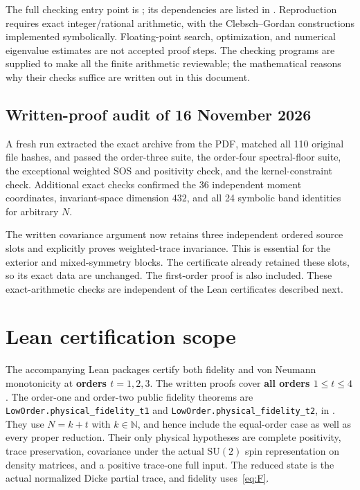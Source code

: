\documentclass[11pt,a4paper]{article}
\begin{document}
The full checking entry point is ; its dependencies
are listed in . Reproduction requires exact
integer/rational arithmetic, with the Clebsch--Gordan constructions
implemented symbolically. Floating-point search, optimization, and
numerical eigenvalue estimates are not accepted proof steps. The
checking programs are supplied to make all the finite arithmetic
reviewable; the mathematical reasons why their checks suffice are
written out in this document.

\subsection{Written-proof audit of 16 November 2026}
A fresh run extracted the exact archive from the PDF, matched all 110
original file hashes, and passed the order-three suite, the order-four
spectral-floor suite, the exceptional weighted SOS and positivity check,
and the kernel-constraint check. Additional exact checks confirmed the
36 independent moment coordinates, invariant-space dimension $432$, and
all 24 symbolic band identities for arbitrary $N$.

The written covariance argument now retains three independent ordered
source slots and explicitly proves weighted-trace invariance. This is
essential for the exterior and mixed-symmetry blocks. The certificate
already retained these slots, so its exact data are unchanged.
The first-order proof is also included. These exact-arithmetic checks are independent of the Lean certificates
described next.

\clearpage\section{Lean certification scope}\label{sec:lean}
The accompanying Lean packages certify both fidelity and von Neumann
monotonicity at \textbf{orders $t=1,2,3$}. The written proofs cover
\textbf{all orders $1\le t\le4$}. The order-one and order-two public fidelity theorems are
\texttt{LowOrder.physical\_fidelity\_t1} and
\texttt{LowOrder.physical\_fidelity\_t2}, in .
They use $N=k+t$ with $k\in\mathbb N$, and hence include the equal-order
case as well as every proper reduction. Their only physical hypotheses
are complete positivity, trace preservation, covariance under the actual
$\mathrm{SU}(2)$ spin representation on density matrices, and a positive
trace-one full input. The reduced state is the actual normalized Dicke
partial trace, and fidelity uses~\eqref{eq:F}.
\end{document}
